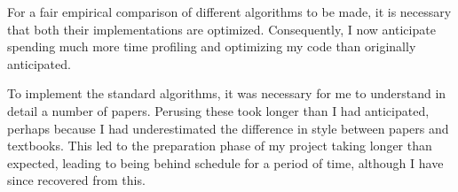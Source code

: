 For a fair empirical comparison of different algorithms to be made, it is necessary that both their implementations are optimized. Consequently, I now anticipate spending much more time profiling and optimizing my code than originally anticipated.

To implement the standard algorithms, it was necessary for me to understand in detail a number of papers. Perusing these took longer than I had anticipated, perhaps because I had underestimated the difference in style between papers and textbooks. This led to the preparation phase of my project taking longer than expected, leading to being behind schedule for a period of time, although I have since recovered from this.
